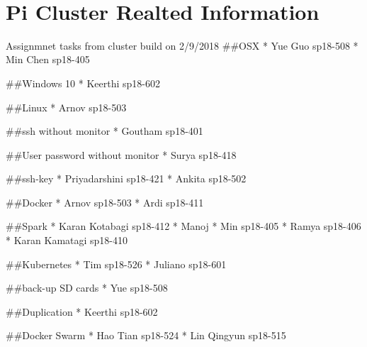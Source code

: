 \MDNAME\

\section{Pi Cluster Realted Information}

Assignmnet tasks from cluster build on 2/9/2018 \#\#OSX * Yue Guo
sp18-508 * Min Chen sp18-405

\#\#Windows 10 * Keerthi sp18-602

\#\#Linux * Arnov sp18-503

\#\#ssh without monitor * Goutham sp18-401

\#\#User password without monitor * Surya sp18-418

\#\#ssh-key * Priyadarshini sp18-421 * Ankita sp18-502

\#\#Docker * Arnov sp18-503 * Ardi sp18-411

\#\#Spark * Karan Kotabagi sp18-412 * Manoj * Min sp18-405 * Ramya
sp18-406 * Karan Kamatagi sp18-410

\#\#Kubernetes * Tim sp18-526 * Juliano sp18-601

\#\#back-up SD cards * Yue sp18-508

\#\#Duplication * Keerthi sp18-602

\#\#Docker Swarm * Hao Tian sp18-524 * Lin Qingyun sp18-515


